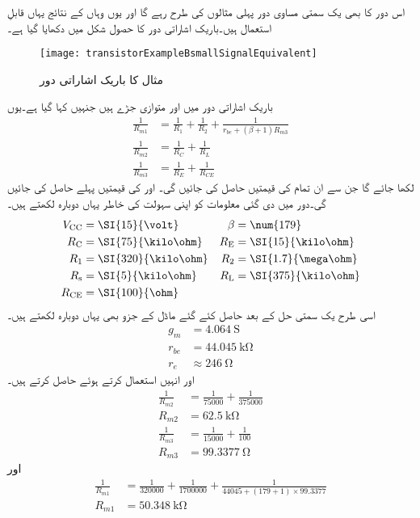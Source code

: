 اس دور کا بھی یک سمتی مساوی دور پہلی مثالوں کی طرح رہے گا اور یوں وہاں کے نتائج یہاں قابلِ استعمال ہیں۔باریک اشاراتی دور کا حصول شکل   میں دکھایا گیا ہے۔
\begin{figure}
\centering
\texttt{[image: transistorExampleBsmallSignalEquivalent]}
\caption{مثال کا باریک اشاراتی دور}
\label{شکل_مثال_ب_کا_باریک_اشاراتی_دور}
\end{figure}
باریک اشاراتی دور میں  اور  متوازی جڑے ہیں جنہیں   کہا گیا ہے۔یوں
\begin{align*}
\frac{1}{R_{m1}}&=\frac{1}{R_1}+\frac{1}{R_2}+\frac{1}{r_{be}+\left(\beta+1 \right )R_{m3}}\\
\frac{1}{R_{m2}}&=\frac{1}{R_C}+\frac{1}{R_L}\\
\frac{1}{R_{m3}}&=\frac{1}{R_E}+\frac{1}{R_{CE}}
\end{align*}
لکھا جائے گا جن سے ان تمام کی قیمتیں حاصل کی جائیں گی۔  اور  کی قیمتیں پہلے حاصل کی جائیں گی۔دور میں دی گئی معلومات کو اپنی سہولت کی خاطر یہاں دوبارہ لکھتے ہیں۔
\begin{align*} 
V_{\textup{CC}} &=\SI{15}{\volt} & \beta&=\num{179}\\ 
R_{\textup{C}} &=\SI{75}{\kilo \ohm} &  R_{\textup{E}} &=\SI{15}{\kilo \ohm}\\ 
R_{\textup{1}} &=\SI{320}{\kilo \ohm} & R_{\textup{2}} &=\SI{1.7}{\mega \ohm}\\ 
R_{\textup{s}} &=\SI{5}{\kilo \ohm} & R_{\textup{L}} &=\SI{375}{\kilo \ohm} \\
R_{\textup{CE}}&=\SI{100}{\ohm}
\end{align*}
اسی طرح  یک سمتی حل کے بعد حاصل کئے گئے ماڈل کے جزو بھی یہاں دوبارہ لکھتے ہیں۔
\begin{align*}
g_m&=\SI{4.064}{\siemens}\\
r_{be}&=\SI{44.045}{\kilo \ohm} \\
r_e & \approx \SI{246}{ \ohm}
\end{align*}
اور انہیں استعمال کرتے ہوئے حاصل کرتے ہیں۔
\begin{align*}
\frac{1}{R_{m2}}&=\frac{1}{75000} +\frac{1}{375000}\\
R_{m2}&=\SI{62.5}{\kilo \ohm}\\
\frac{1}{R_{m3}}&=\frac{1}{15000}+\frac{1}{100}\\
R_{m3}&=\SI{99.3377}{\ohm}
\end{align*}
اور
\begin{align*}
\frac{1}{R_{m1}}&=\frac{1}{320000}+\frac{1}{1700000}+\frac{1}{44045+(179+1) \times 99.3377}\\
R_{m1}&=\SI{50.348}{\kilo \ohm}
\end{align*}
